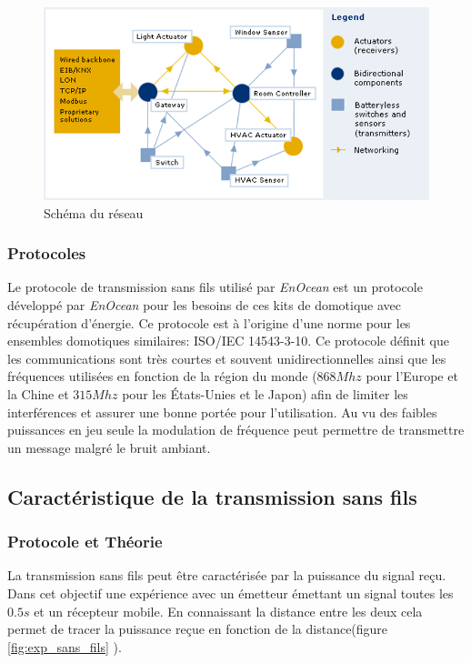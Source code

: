 \documentclass{rapportENS}
\begin{document}
 \begin{figure}[h!]
     \centering
     \includegraphics[width=\linewidth]{resseaux.png}
     \caption{Schéma du réseau}
     \label{fig:resseaux}
 \end{figure}
 
 \subsubsection{Protocoles}
 Le protocole de transmission sans fils utilisé par \textit{EnOcean} est un protocole développé par \textit{EnOcean} pour les besoins de ces kits de domotique avec récupération d'énergie. Ce protocole est à l'origine d'une norme pour les ensembles domotiques similaires: ISO/IEC 14543-3-10. Ce protocole définit que les communications sont très courtes et souvent unidirectionnelles ainsi que les fréquences utilisées en fonction de la région du monde ($868 Mhz$ pour l'Europe et la Chine et $315Mhz$ pour les États-Unies et le Japon) afin de limiter les interférences et assurer une bonne portée pour l'utilisation. Au vu des faibles puissances en jeu seule la modulation de fréquence peut permettre de transmettre un message malgré le bruit ambiant. 
 
 \subsection{Caractéristique de la transmission sans fils}
 \subsubsection{Protocole et Théorie}
La transmission sans fils peut être caractérisée par la puissance du signal reçu. Dans cet objectif une expérience avec un émetteur émettant un signal toutes les $0.5 s$ et un récepteur mobile. En connaissant la distance entre les deux cela permet de tracer la puissance reçue en fonction de la distance(figure \ref{fig:exp_sans_fils} ). 
\end{document}

